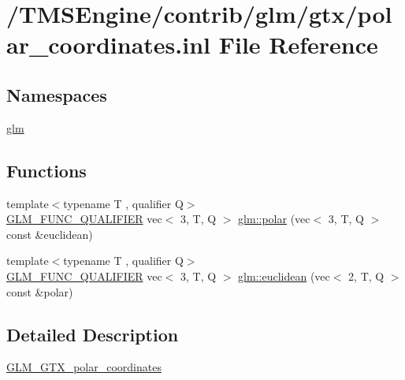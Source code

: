 \hypertarget{polar__coordinates_8inl}{}\section{/\+T\+M\+S\+Engine/contrib/glm/gtx/polar\+\_\+coordinates.inl File Reference}
\label{polar__coordinates_8inl}
\subsection*{Namespaces}
\begin{DoxyCompactItemize}
\item 
 \hyperlink{namespaceglm}{glm}
\end{DoxyCompactItemize}
\subsection*{Functions}
\begin{DoxyCompactItemize}
\item 
{\footnotesize template$<$typename T , qualifier Q$>$ }\\\hyperlink{setup_8hpp_a33fdea6f91c5f834105f7415e2a64407}{G\+L\+M\+\_\+\+F\+U\+N\+C\+\_\+\+Q\+U\+A\+L\+I\+F\+I\+ER} vec$<$ 3, T, Q $>$ \hyperlink{group__gtx__polar__coordinates_gab83ac2c0e55b684b06b6c46c28b1590d}{glm\+::polar} (vec$<$ 3, T, Q $>$ const \&euclidean)
\item 
{\footnotesize template$<$typename T , qualifier Q$>$ }\\\hyperlink{setup_8hpp_a33fdea6f91c5f834105f7415e2a64407}{G\+L\+M\+\_\+\+F\+U\+N\+C\+\_\+\+Q\+U\+A\+L\+I\+F\+I\+ER} vec$<$ 3, T, Q $>$ \hyperlink{group__gtx__polar__coordinates_ga1821d5b3324201e60a9e2823d0b5d0c8}{glm\+::euclidean} (vec$<$ 2, T, Q $>$ const \&polar)
\end{DoxyCompactItemize}


\subsection{Detailed Description}
\hyperlink{group__gtx__polar__coordinates}{G\+L\+M\+\_\+\+G\+T\+X\+\_\+polar\+\_\+coordinates} 